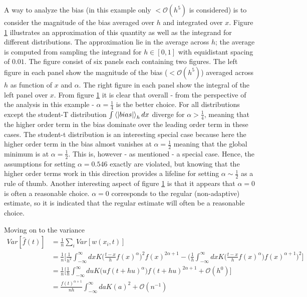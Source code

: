 \documentclass[
twoside,
openright,
titlepage,
numbers=noenddot,
headinclude,%
footinclude=true,
dottedtoc, %
ngerman,
american, %
pagesize=pdftex,
]{book}
\begin{document}
\begin{example}
\begin{figure}[H]
			\label{fig:e1}
		\end{figure}
		\noindent A way to analyze the bias (in this example only $<\mathcal{O}(h^5)$ is considered) is to consider the magnitude of the bias averaged over $h$ and integrated over $x$. Figure \ref{fig:e1} illustrates an approximation of this quantity as well as the integrand for different distributions. The approximation lie in the average across $h$; the average is computed from sampling the integrand for $h\in [0,1]$ with equidistant spacing of $0.01$. The figure consist of six panels each containing two figures. The left figure in each panel show the magnitude of the bias ($<\mathcal{O}(h^5)$) averaged across $h$ as function of $x$ and $\alpha$. The right figure in each panel show the integral of the left panel over $x$. \newline
		From figure \ref{fig:e1} it is clear that overall - from the perspective of the analysis in this example - $\alpha=\frac{1}{4}$ is the better choice. For all distributions except the student-T distribution $\int \braket{|bias|}_hdx$ diverge for $\alpha>\frac{1}{4}$, meaning that the higher order term in the bias dominate over the leading order term in these cases. The student-t distribution is an interesting special case because here the higher order term in the bias almost vanishes at $\alpha=\frac{1}{2}$ meaning that the global minimum is at $\alpha=\frac{1}{2}$. This is, however - as mentioned - a special case. Hence, the assumptions for setting $\alpha=0.546$ exactly are violated, but knowing that the higher order terms work in this direction provides a lifeline for setting $\alpha\sim\frac{1}{2}$ as a rule of thumb.\newline
		Another interesting aspect of figure \ref{fig:e1} is that it appears that $\alpha=0$ is often a reasonable choice. $\alpha=0$ corresponds to the regular (non-adaptive) estimate, so it is indicated that the regular estimate will often be a reasonable choice.
	\end{example}
	Moving on to the variance
	\begin{equation}
		\begin{split}
			Var[\hat{f}(t)]&=\frac{1}{n}\sum_iVar[w(x_i,t)]\\
			&=\frac{1}{n}\bigg[\frac{1}{h^2}\int_{-\infty}^{\infty}dx K\bigg(\frac{t-x}{h}f(x)^\alpha\bigg)^2f(x)^{2\alpha+1}-\bigg(\frac{1}{h}\int_{-\infty}^{\infty}dxK\bigg(\frac{t-x}{h}f(x)^\alpha\bigg)f(x)^{\alpha+1}\bigg)^2\bigg]\\
			&=\frac{1}{n}\bigg[\frac{1}{h}\int_{-\infty}^{\infty}du K\big(uf(t+hu)^\alpha\big)f(t+hu)^{2\alpha+1}+\mathcal{O}(h^0)\bigg]\\
			&=\frac{f(t)^{\alpha+1}}{nh}\int_{-\infty}^{\infty}da K(a)^2+\mathcal{O}(n^{-1})\\
		\end{split}
	\end{equation}
\end{document}
